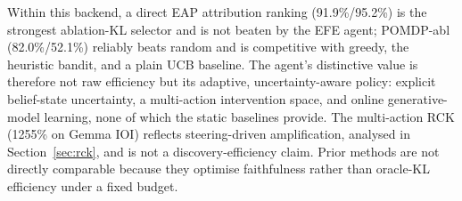 \begin{table}[H]
\centering
\caption{Contextual comparison of \ACD{} with published circuit
discovery methods on IOI.}
\label{tab:sota}
\end{table}

Within this backend, a direct EAP attribution ranking
(91.9\%/95.2\%) is the strongest ablation-KL selector and is not beaten
by the EFE agent; POMDP-abl (82.0\%/52.1\%) reliably beats random and
is competitive with greedy, the heuristic bandit, and a plain UCB
baseline.  The agent's distinctive
value is therefore not raw efficiency but its adaptive,
uncertainty-aware policy: explicit belief-state uncertainty, a
multi-action intervention space, and online generative-model learning,
none of which the static baselines provide.  The multi-action RCK
(1255\% on Gemma IOI) reflects steering-driven amplification, analysed
in Section~\ref{sec:rck}, and is not a discovery-efficiency claim.
Prior methods are not directly comparable because they optimise
faithfulness rather than oracle-KL efficiency under a fixed budget.
